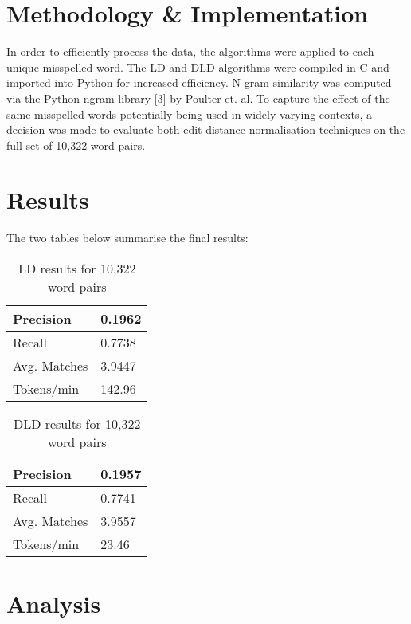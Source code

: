 \documentclass[11pt]{article}
\begin{document}
\section{Methodology \& Implementation}
In order to efficiently process the data, the algorithms were applied to each unique misspelled word.
The LD and DLD algorithms were compiled in C and imported into Python for increased efficiency. N-gram
similarity was computed via the Python ngram library [3] by Poulter et. al. To capture the effect of the same misspelled words potentially being used in widely varying contexts, a decision was made to evaluate both edit distance normalisation techniques on the full set of 10,322 word pairs. 


\section{Results}
The two tables below summarise the final results:

\begin{table}[h]
\begin{center}
\begin{tabular}{|l|l|}
      \hline
      Precision & 0.1962\\
      \hline
      Recall & 0.7738\\
      \hline
      Avg. Matches & 3.9447\\
      \hline
      Tokens/min & 142.96\\
      \hline
\end{tabular}
\caption{LD results for 10,322 word pairs}\label{table1}
\end{center}
\end{table}


\begin{table}[h]
\begin{center}
\begin{tabular}{|l|l|}
      \hline
      Precision & 0.1957\\
      \hline
      Recall & 0.7741\\
      \hline
      Avg. Matches & 3.9557\\
      \hline
      Tokens/min & 23.46\\
      \hline
\end{tabular}
\caption{DLD results for 10,322 word pairs}\label{table2}
\end{center}
\end{table}

\section{Analysis}
\end{document}
